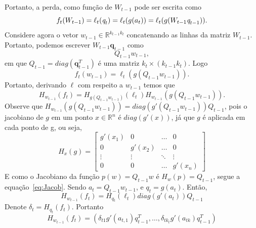 \documentclass[
	12pt,				%
    oneside,			%
	a4paper,			%
	english,			%
	french,				%
	spanish,			%
	brazil,				%
	]{abntex2}
\begin{document}
            Portanto, a perda, como função de $W_{t-1}$ pode ser escrita como
            \begin{equation*}
                f_t(W_{t-1}) = \ell_t(\emph{q}_t) = \ell_t(g(a_t)) = \ell_t(g(W_{t-1}\emph{q}_{t-1})).
            \end{equation*}
            Considere agora o vetor $w_{t-1} \in \mathbb{R}^{k_{t-1}k_t}$ concatenando as linhas da matriz $W_{t-1}$. Portanto, podemos escrever $W_{t-1}\textbf{q}_{t-1}$ como
            \begin{equation*}
                Q_{t-1}w_{t-1},
            \end{equation*}
            em que $Q_{t-1} = diag(\textbf{q}_{t-1}^T)$ é uma matriz $k_t \times (k_{t-1}k_t)$. Logo
            \begin{equation*}
                f_t(w_{t-1}) = \ell_t(g(Q_{t-1}w_{t-1})).
            \end{equation*}
            Portanto, derivando $\ell$ com respeito a $w_{t-1}$ temos que
            \begin{equation}\label{eq:Jacob}
                H_{w_{t-1}}(f_t) = H_{g(Q_{t-1}w_{t-1})}(\ell_t)H_{w_{t-1}}(g(Q_{t-1}w_{t-1})).
            \end{equation}
            Observe que $H_{w_{t-1}}(g(Q_{t-1}w_{t-1})) = diag(g'(Q_{t-1}w_{t-1}))Q_{t-1}$, pois o jacobiano de $g$ em um ponto $x\in\mathbb{R}^n$ é $diag(g'(x))$, já que $g$ é aplicada em cada ponto de g, ou seja,
            \begin{equation*}
                H_x(g) = \begin{bmatrix}
                g'(x_1) & 0 & \dots  & 0 \\
                0 & g'(x_2) & \dots  & 0 \\
                \vdots & \vdots & \ddots & \vdots \\
                0 & 0 & \dots & g'(x_n)
                \end{bmatrix}
            \end{equation*}
            E como o Jacobiano da função $p(w) = Q_{t-1}w$ é $H_w(p) = Q_{t-1}$, segue a equação~\eqref{eq:Jacob}. Sendo $a_t = Q_{t-1}w_{t-1}$, e $q_t = g(a_t)$. Então,
            \begin{equation*}
                H_{w_{t-1}}(f_t) = H_{q_{t}}(\ell_t)diag(g'(a_t))Q_{t-1}
            \end{equation*}
            Denote $\delta_t = H_{q_t}(f_t)$. Portanto
            \begin{equation}\label{eq:Jacpar}
                H_{w_{t-1}}(f_t) = \left(\delta_{t1}g'(a_{t,1})q_{t-1}^{T},\dots,\delta_{tk_t}g'(a_{tk})q_{t-1}^{T}\right)
            \end{equation}
\end{document}
